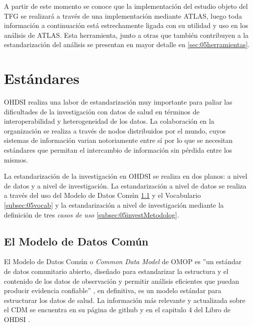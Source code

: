 A partir de este momento se conoce que la implementación del estudio objeto del TFG se realizará a través de una implementación mediante ATLAS, luego toda información a continuación está estrechamente ligada con su utilidad y uso en los análisis de ATLAS. Esta herramienta, junto a otras que también contribuyen a la estandarización del análisis se presentan en mayor detalle en \ref{sec:05herramientas}.

\section{Estándares}


OHDSI realiza una labor de estandarización muy importante para paliar las dificultades de la investigación con datos de salud en términos de interoperabilidad y heterogeneidad de los datos. La colaboración en la organización se realiza a través de nodos distribuidos por el mundo, cuyos sistemas de información varian notoriamente entre sí por lo que se necesitan estándares que permitan el intercambio de información sin pérdida entre los mismos.

La estandarización de la investigación en OHDSI se realiza en dos planos: a nivel de datos y a nivel de investigación. La estandarización a nivel de datos se realiza a través del uso del Modelo de Datos Común \ref{subsec:05cdm} y el Vocabulario \ref{subsec:05vocab} y la estandarización a nivel de investigación mediante la definición de tres \textit{casos de uso} \ref{subsec:05investMetodolog}.

\subsection{El Modelo de Datos Común} \label{subsec:05cdm}

El Modelo de Datos Común o \textit{Common Data Model} de OMOP es ''un estándar de datos comunitario abierto, diseñado para estandarizar la estructura y el contenido de los datos de observación y permitir análisis eficientes que puedan producir evidencia confiable'' \cite{gitPagesCMD}, en definitiva, es un modelo estándar para estructurar los datos de salud. La información más relevante y actualizada sobre el CDM se encuentra en su página de github \cite{gitPagesCMD} y en el capitulo 4 del Libro de OHDSI \cite{OHDSIbook}.

